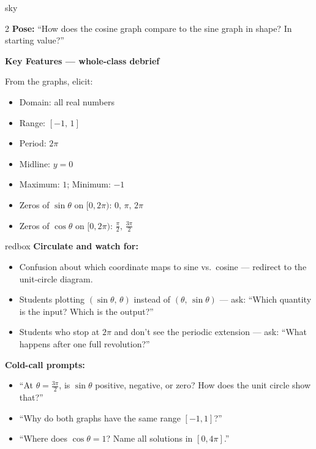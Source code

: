 \documentclass[10pt]{article}
\begin{document}
\begin{skillbox}[Lesson]{sky}
\begin{multicols}{2}
    \vspace{6pt}
    \textbf{Pose:} ``How does the cosine graph compare to the sine graph in shape? In
    starting value?''

    \vspace{6pt}
    \textbf{Key Features --- whole-class debrief}

    \vspace{4pt}
    From the graphs, elicit:
    \begin{itemize}[leftmargin=1.2em, itemsep=2pt]
        \item Domain: all real numbers
        \item Range: $[-1,\,1]$
        \item Period: $2\pi$
        \item Midline: $y=0$
        \item Maximum: $1$; Minimum: $-1$
        \item Zeros of $\sin\theta$ on $[0,2\pi)$: $0,\,\pi,\,2\pi$
        \item Zeros of $\cos\theta$ on $[0,2\pi)$: $\tfrac{\pi}{2},\,\tfrac{3\pi}{2}$
    \end{itemize}
\end{multicols}
\end{skillbox}

\begin{skillbox}{redbox}
    \textbf{Circulate and watch for:}
    \begin{itemize}[leftmargin=1.2em, itemsep=3pt]
        \item Confusion about which coordinate maps to sine vs.\ cosine --- redirect to the
              unit-circle diagram.
        \item Students plotting $(\sin\theta,\,\theta)$ instead of $(\theta,\,\sin\theta)$ ---
              ask: ``Which quantity is the input? Which is the output?''
        \item Students who stop at $2\pi$ and don't see the periodic extension --- ask:
              ``What happens after one full revolution?''
    \end{itemize}
    \textbf{Cold-call prompts:}
    \begin{itemize}[leftmargin=1.2em, itemsep=3pt]
        \item ``At $\theta=\tfrac{3\pi}{2}$, is $\sin\theta$ positive, negative, or zero?
              How does the unit circle show that?''
        \item ``Why do both graphs have the same range $[-1,1]$?''
        \item ``Where does $\cos\theta=1$? Name all solutions in $[0,4\pi]$.''
    \end{itemize}
\end{skillbox}
\end{document}
